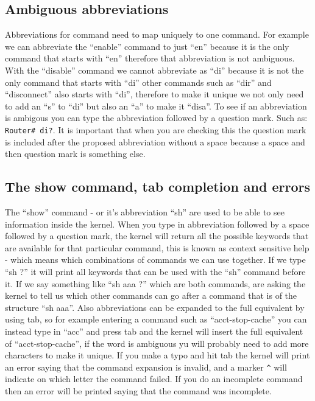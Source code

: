\subsection{Ambiguous abbreviations}
Abbreviations for command need to map uniquely to one command. For example we can abbreviate the ``enable'' command to just ``en'' because it is the only command that starts with ``en'' therefore that abbreviation is not ambiguous. With the ``disable'' command we cannot abbreviate as ``di'' because it is not the only command that starts with ``di'' other commands such as ``dir'' and ``disconnect'' also starts with ``di'', therefore to make it unique we not only need to add an ``s'' to ``di'' but also an ``a'' to make it ``disa''. To see if an abbreviation is ambigous you can type the abbreviation followed by a question mark. Such as: \verb|Router# di?|. It is important that when you are checking this the question mark is included after the proposed abbreviation without a space because a space and then question mark is something else.

\subsection{The show command, tab completion and errors}
The ``show'' command - or it's abbreviation ``sh'' are used to be able to see information inside the kernel. When you type in abbreviation followed by a space followed by a question mark, the kernel will return all the possible keywords that are available for that particular command, this is known as context sensitive help - which means which combinations of commands we can use together.  If we type ``sh ?'' it will print all keywords that can be used with the ``sh'' command before it. If we say something like ``sh aaa ?'' which are both commands, are asking the kernel to tell us which other commands can go after a command that is of the structure ``sh aaa''. Also abbreviations can be expanded to the full equivalent by using tab, so for example entering a command such as ``acct-stop-cache'' you can instead type in ``acc'' and press tab and the kernel will insert the full equivalent of ``acct-stop-cache'', if the word is ambiguous yu will probably need to add more characters to make it unique. If you make a typo and hit tab the kernel will print an error saying that the command expansion is invalid, and a marker \verb|^| will indicate on which letter the command failed. If you do an incomplete command then an error will be printed saying that the command was incomplete.


